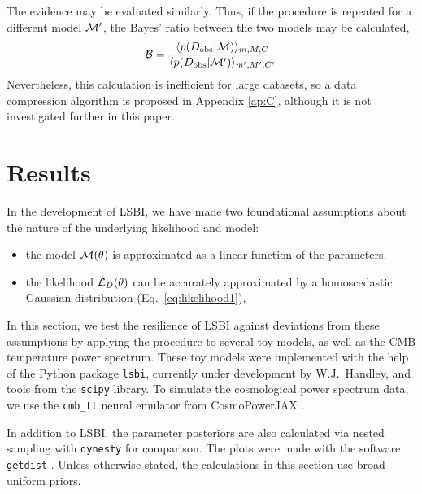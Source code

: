\documentclass[%
 reprint,
 amsmath,amssymb,
 aps,
]{revtex4-2}
\begin{document}
The evidence may be evaluated similarly. Thus, if the procedure is repeated for a different model $\mathcal{M}'$, the Bayes' ratio between the two models may be calculated,
\begin{equation}
	\mathcal{B} = \frac{\langle p(D_\text{obs}|\mathcal{M})\rangle_{m,M,C}}{\langle p(D_\text{obs}|\mathcal{M}')\rangle_{m',M',C'}}
\end{equation}
Nevertheless, this calculation is inefficient for large datasets, so a data compression algorithm is proposed in Appendix \ref{ap:C}, although it is not investigated further in this paper.










\section{Results}\label{sec:toy_models}



In the development of LSBI, we have made two foundational assumptions about the nature of the underlying likelihood and model:
\begin{itemize}
	\item the model $\mathcal{M}(\theta)$ is approximated as a linear function of the parameters.
	\item the likelihood $\mathcal{L}_D(\theta)$ can be accurately approximated by a homoscedastic Gaussian distribution (Eq.~\ref{eq:likelihood1}),
\end{itemize}
In this section, we test the resilience of LSBI against deviations from these assumptions by applying the procedure to several toy models, as well as the CMB temperature power spectrum. These toy models were implemented with the help of the Python package \texttt{lsbi}, currently under development by W.J.~Handley, and tools from the \texttt{scipy} library. To simulate the cosmological power spectrum data, we use the \texttt{cmb\_tt} neural emulator from CosmoPowerJAX \cite{piras2023cosmopower,spurio2022cosmopower}. 

In addition to LSBI, the parameter posteriors are also calculated via nested sampling with \texttt{dynesty} \cite{speagle2020dynesty,koposov2022joshspeagle,higson2019dynamic} for comparison. The plots were made with the software \texttt{getdist} \cite{lewis2019getdist}.  Unless otherwise stated, the calculations in this section use broad uniform priors.
\end{document}
